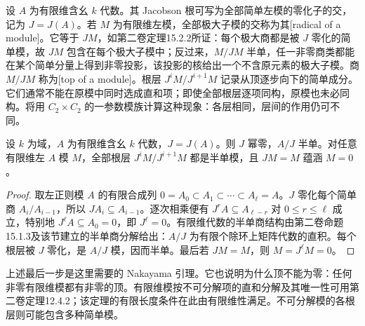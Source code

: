 设 \(A\) 为有限维含幺 \(k\) 代数。其 Jacobson 根可写为全部简单左模的零化子的交，记为 \(J=J(A)\)。若 \(M\) 为有限维左模，全部极大子模的交称为其[radical of a module]。它等于 \(JM\)，如第二卷定理15.2.2所证：每个极大商都是被 \(J\) 零化的简单模，故 \(JM\) 包含在每个极大子模中；反过来，\(M/JM\) 半单，任一非零商类都能在某个简单分量上得到非零投影，该投影的核给出一个不含原元素的极大子模。商 \(M/JM\) 称为[top of a module]。根层 \(J^iM/J^{i+1}M\) 记录从顶逐步向下的简单成分。它们通常不能在原模中同时选成直和项；即使全部根层逐项同构，原模也未必同构。将用 \(C_2\times C_2\) 的一参数模族计算这种现象：各层相同，层间的作用仍可不同。
\begin{proposition}\label{b5:prop:finite-radical-layers}
	设 \(k\) 为域，\(A\) 为有限维含幺 \(k\) 代数，\(J=J(A)\)。则 \(J\) 幂零，\(A/J\) 半单。对任意有限维左 \(A\) 模 \(M\)，全部根层 \(J^iM/J^{i+1}M\) 都是半单模，且 \(JM=M\) 蕴涵 \(M=0\)。
\end{proposition}
\begin{proof}
	取左正则模 \(A\) 的有限合成列 \(0=A_0\subset A_1\subset\cdots\subset A_\ell=A\)。\(J\) 零化每个简单商 \(A_i/A_{i-1}\)，所以 \(JA_i\subseteq A_{i-1}\)。逐次相乘便有 \(J^rA\subseteq A_{\ell-r}\) 对 \(0\le r\le\ell\) 成立，特别地 \(J^\ell A\subseteq A_0=0\)，即 \(J^\ell=0\)。有限维代数的半单商结构由第二卷命题15.1.3及该节建立的半单商分解给出：\(A/J\) 为有限个除环上矩阵代数的直积。每个根层被 \(J\) 零化，是 \(A/J\) 模，因而半单。最后若 \(JM=M\)，则 \(M=J^\ell M=0\)。
\end{proof}
上述最后一步是这里需要的 Nakayama 引理。它也说明为什么顶不能为零：任何非零有限维模都有非零的顶。有限维模按不可分解项的直和分解及其唯一性可用第二卷定理12.4.2；该定理的有限长度条件在此由有限维性满足。不可分解模的各根层则可能包含多种简单模。

